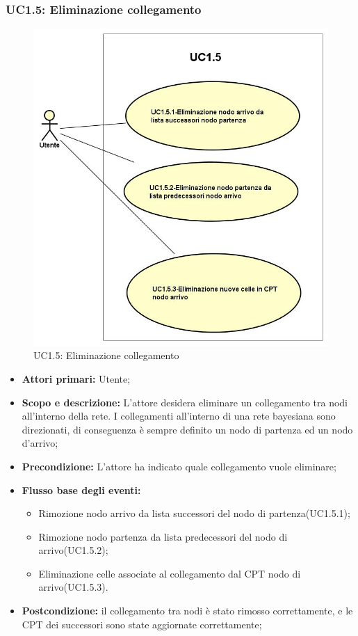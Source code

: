 \subsubsection{UC1.5: Eliminazione collegamento} 
\begin{figure} [H]
	\centering
	\includegraphics[scale=0.45]{Img/UC1-5} 
	\caption{UC1.5: Eliminazione collegamento} \label{} 
\end{figure} 
\begin{itemize} 
	\item{\textbf{Attori primari:} Utente;} 
	\item{\textbf{Scopo e descrizione:} L'attore desidera eliminare un collegamento tra nodi all'interno della rete. I collegamenti all'interno di una rete bayesiana sono direzionati, di conseguenza è sempre definito un nodo di partenza ed un nodo d'arrivo;} 
	\item{\textbf{Precondizione:} L'attore ha indicato quale collegamento vuole eliminare;} 
	\item{\textbf{Flusso base degli eventi:} } 
		\begin{itemize} 
			\item{Rimozione nodo arrivo da lista successori del nodo di partenza(UC1.5.1);} 
			\item{Rimozione nodo partenza da lista predecessori del nodo di arrivo(UC1.5.2);} 
			\item{Eliminazione celle associate al collegamento dal CPT nodo di arrivo(UC1.5.3).} 
		\end{itemize} 
	\item{\textbf{Postcondizione:} il collegamento tra nodi è stato rimosso correttamente, e le CPT dei successori sono state aggiornate correttamente;} 
\end{itemize} 
